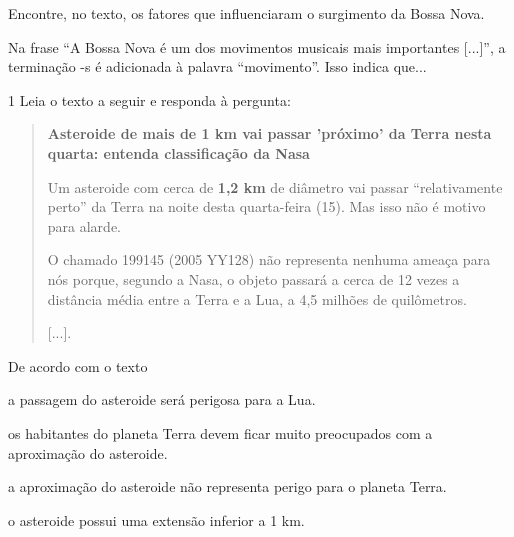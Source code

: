 \begin{escolha}
\item Encontre, no texto, os fatores que influenciaram o surgimento da Bossa Nova.



\item Na frase ``A Bossa Nova é um dos movimentos musicais mais importantes {[}...{]}'', a terminação -s é adicionada à palavra ``movimento''. Isso indica que...

\end{escolha}



\num{1} Leia o texto a seguir e responda à pergunta:


\begin{quote}
\textbf{Asteroide de mais de 1 km vai passar 'próximo' da Terra nesta
quarta: entenda classificação da Nasa}

Um asteroide com cerca de \textbf{1,2 km} de diâmetro vai passar
``relativamente perto'' da Terra na noite desta quarta-feira (15). Mas
isso não é motivo para alarde.

O chamado 199145 (2005 YY128) não representa nenhuma ameaça para nós
porque, segundo a Nasa, o
objeto passará a cerca de 12 vezes a distância média entre a Terra e a
Lua, a 4,5 milhões de quilômetros.

{[}...{]}.

\end{quote}

De acordo com o texto

\begin{escolha}
\item a passagem do asteroide será perigosa para a Lua.

\item os habitantes do planeta Terra devem ficar muito preocupados com a
aproximação do asteroide.

\item a aproximação do asteroide não representa perigo para o planeta
Terra.

\item o asteroide possui uma extensão inferior a 1 km.
\end{escolha}

